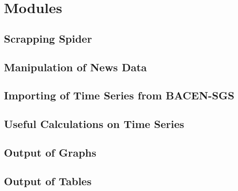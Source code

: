 \documentclass[cic,tc, english]{iiufrgs}
\begin{document}
\section{Modules}

\subsection{Scrapping Spider}

    
    
\subsection{Manipulation of News Data}

    

\subsection{Importing of Time Series from BACEN-SGS}

    

\subsection{Useful Calculations on Time Series}

    

\subsection{Output of Graphs}

    

\subsection{Output of Tables}

    


 \label{chapter_bibliography}
\end{document}
